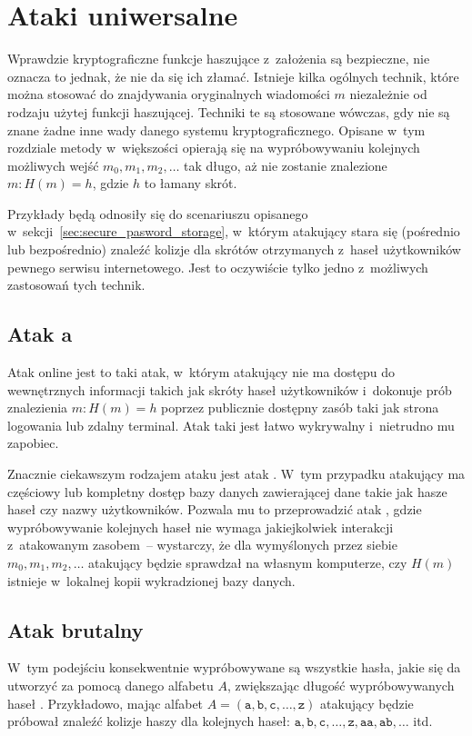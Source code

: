 \section{Ataki uniwersalne}
\label{sec:universal_attacks}
Wprawdzie kryptograficzne funkcje haszujące z~założenia są bezpieczne, nie
oznacza to jednak, że nie da się ich złamać. Istnieje kilka ogólnych technik,
które można stosować do znajdywania oryginalnych wiadomości $m$ niezależnie od
rodzaju użytej funkcji haszującej. Techniki te są stosowane wówczas, gdy nie są
znane żadne inne wady danego systemu kryptograficznego. Opisane w~tym rozdziale
metody w~większości opierają się na wypróbowywaniu kolejnych możliwych wejść
$m_0, m_1, m_2, \ldots$ tak długo, aż nie zostanie znalezione $m : H(m) = h$,
gdzie $h$ to łamany skrót.

Przykłady będą odnosiły się do scenariuszu opisanego
w~sekcji~\ref{sec:secure_pasword_storage}, w~którym atakujący stara się
(pośrednio lub bezpośrednio) znaleźć kolizje dla skrótów otrzymanych z~haseł
użytkowników pewnego serwisu internetowego. Jest to oczywiście tylko jedno
z~możliwych zastosowań tych technik.



\subsection{Atak  a~}
Atak online jest to taki atak, w~którym atakujący nie ma dostępu do
wewnętrznych informacji takich jak skróty haseł użytkowników i~dokonuje prób
znalezienia \mbox{$m : H(m) = h$} poprzez publicznie dostępny zasób taki jak
strona logowania lub zdalny terminal. Atak taki jest łatwo wykrywalny
i~nietrudno mu zapobiec.

Znacznie ciekawszym rodzajem ataku jest atak . W~tym przypadku
atakujący ma częściowy lub kompletny dostęp bazy danych zawierającej dane takie
jak hasze haseł czy nazwy użytkowników. Pozwala mu to przeprowadzić atak
, gdzie wypróbowywanie kolejnych haseł nie wymaga jakiejkolwiek
interakcji z~atakowanym zasobem~-- wystarczy, że dla wymyślonych przez siebie
$m_0, m_1, m_2, \ldots$ atakujący będzie sprawdzał na własnym komputerze, czy
$H(m)$ istnieje w~lokalnej kopii wykradzionej bazy danych.



\subsection{Atak brutalny}
W~tym podejściu konsekwentnie wypróbowywane są wszystkie hasła, jakie się da
utworzyć za pomocą danego alfabetu $A$, zwiększając długość wypróbowywanych
haseł . Przykładowo, mając alfabet $A=(\mathtt{a},
\mathtt{b}, \mathtt{c}, \ldots, \mathtt{z})$ atakujący będzie próbował znaleźć
kolizje haszy dla kolejnych haseł: $\mathtt{a}, \mathtt{b}, \mathtt{c}, \ldots,
\mathtt{z}, \mathtt{aa}, \mathtt{ab}, \ldots$ itd.

